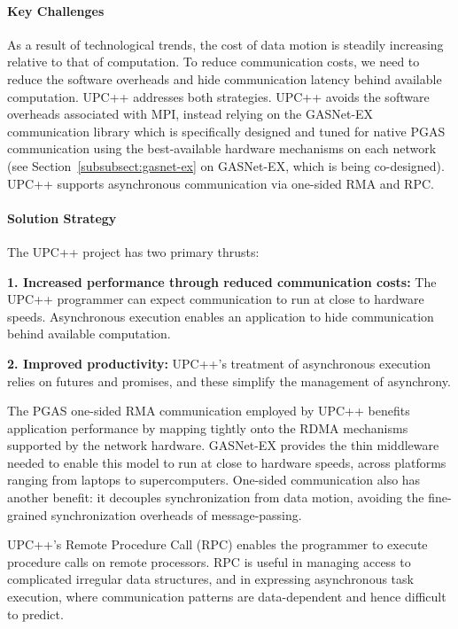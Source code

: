 \paragraph{Key  Challenges}

As a result of technological trends, the cost of data motion is steadily increasing relative to that of computation.  To reduce communication costs, we need to 
reduce the software overheads and hide communication latency behind available computation. UPC++ addresses both strategies.
UPC++ avoids the software overheads associated with MPI, 
instead relying on the GASNet-EX~\cite{gasnet-site,gasnet-lcpc18}
communication library which is specifically designed and tuned
for native PGAS communication using the best-available hardware
mechanisms on each network
(see Section~\ref{subsubsect:gasnet-ex} on GASNet-EX, which is being co-designed).
UPC++ supports asynchronous communication via one-sided RMA and RPC.

\paragraph{Solution Strategy}

The UPC++ project has two primary thrusts:


\textbf{1. Increased performance through reduced communication costs:} The
UPC++ programmer can expect communication to run at close to hardware speeds.
Asynchronous execution enables an application to hide communication behind
available computation.

\textbf{2. Improved productivity:}  UPC++'s treatment of asynchronous
execution relies on futures and promises, and these simplify the management of
asynchrony.

The PGAS one-sided RMA communication employed by UPC++
benefits application  performance by mapping tightly onto the RDMA mechanisms
supported by the network hardware. GASNet-EX provides the
thin middleware
needed to enable this model to run at close to hardware speeds, across platforms ranging from laptops to supercomputers.
One-sided communication also has another benefit:
it decouples synchronization from data motion,
avoiding the fine-grained synchronization overheads of message-passing.

UPC++'s Remote Procedure Call (RPC)
enables the programmer
to execute procedure calls on remote processors.
RPC is useful in managing access to complicated irregular data structures,
and in expressing asynchronous task execution, where communication patterns
are data-dependent and hence difficult to predict.

